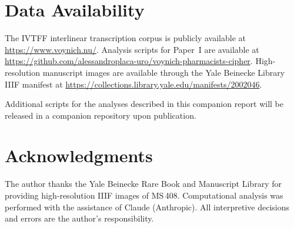 \documentclass[11pt,a4paper]{article}
\begin{document}
\section*{Data Availability}

The IVTFF interlinear transcription corpus is publicly available at \url{https://www.voynich.nu/}. Analysis scripts for Paper~I are available at \url{https://github.com/alessandroplaca-uro/voynich-pharmacists-cipher}. High-resolution manuscript images are available through the Yale Beinecke Library IIIF manifest at \url{https://collections.library.yale.edu/manifests/2002046}.

Additional scripts for the analyses described in this companion report will be released in a companion repository upon publication.

\section*{Acknowledgments}

The author thanks the Yale Beinecke Rare Book and Manuscript Library for providing high-resolution IIIF images of MS\,408. Computational analysis was performed with the assistance of Claude (Anthropic). All interpretive decisions and errors are the author's responsibility.
\end{document}
